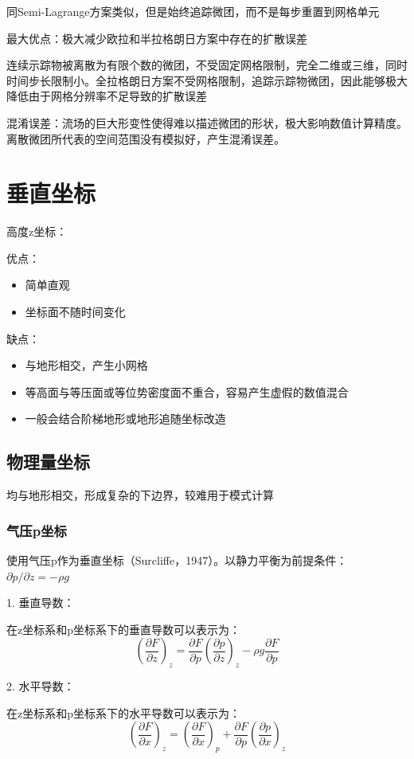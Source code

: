 \documentclass{article}
\begin{document}
同Semi-Lagrange方案类似，但是始终追踪微团，而不是每步重置到网格单元

最大优点：极大减少欧拉和半拉格朗日方案中存在的扩散误差

连续示踪物被离散为有限个数的微团，不受固定网格限制，完全二维或三维，同时时间步长限制小。全拉格朗日方案不受网格限制，追踪示踪物微团，因此能够极大降低由于网格分辨率不足导致的扩散误差

混淆误差：流场的巨大形变性使得难以描述微团的形状，极大影响数值计算精度。离散微团所代表的空间范围没有模拟好，产生混淆误差。

\newpage
\section{垂直坐标}
高度z坐标：

优点：
\begin{itemize}
    \item 简单直观
    \item 坐标面不随时间变化
\end{itemize}

缺点：
\begin{itemize}
    \item 与地形相交，产生小网格
    \item 等高面与等压面或等位势密度面不重合，容易产生虚假的数值混合
    \item 一般会结合阶梯地形或地形追随坐标改造
\end{itemize}
\subsection{物理量坐标}
均与地形相交，形成复杂的下边界，较难用于模式计算
\subsubsection{气压p坐标}
使用气压p作为垂直坐标（Surcliffe，1947）。以静力平衡为前提条件：$\partial p/\partial z=−\rho g$

1. 垂直导数：

在z坐标系和p坐标系下的垂直导数可以表示为：
$$(\frac{\partial F}{\partial z})_z = \frac{\partial F}{\partial p}(\frac{\partial p}{\partial z})_z 
-\rho g \frac{\partial F}{\partial p} $$


2. 水平导数：

在z坐标系和p坐标系下的水平导数可以表示为：
$$(\frac{\partial F}{\partial x})_z = (\frac{\partial F}{\partial x})_p + \frac{\partial F}{\partial p}(\frac{\partial p}{\partial x})_z$$
\end{document}
